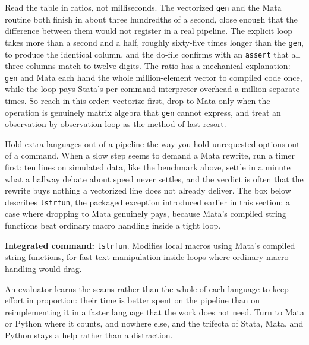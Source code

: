 Read the table in ratios, not milliseconds. The vectorized \texttt{gen} and the Mata routine both finish in about three hundredths of a second, close enough that the difference between them would not register in a real pipeline. The explicit loop takes more than a second and a half, roughly sixty-five times longer than the \texttt{gen}, to produce the identical column, and the do-file confirms with an \texttt{assert} that all three columns match to twelve digits. The ratio has a mechanical explanation: \texttt{gen} and Mata each hand the whole million-element vector to compiled code once, while the loop pays Stata's per-command interpreter overhead a million separate times. So reach in this order: vectorize first, drop to Mata only when the operation is genuinely matrix algebra that \texttt{gen} cannot express, and treat an observation-by-observation loop as the method of last resort.

Hold extra languages out of a pipeline the way you hold unrequested options out of a command. When a slow step seems to demand a Mata rewrite, run a timer first: ten lines on simulated data, like the benchmark above, settle in a minute what a hallway debate about speed never settles, and the verdict is often that the rewrite buys nothing a vectorized line does not already deliver. The box below describes \texttt{lstrfun}, the packaged exception introduced earlier in this section: a case where dropping to Mata genuinely pays, because Mata's compiled string functions beat ordinary macro handling inside a tight loop.

\begin{kaobox}[frametitle=Package Integration: \texttt{lstrfun}]
\textbf{Integrated command:} \texttt{lstrfun}. Modifies local macros using Mata's compiled string functions, for fast text manipulation inside loops where ordinary macro handling would drag.
\end{kaobox}

An evaluator learns the seams rather than the whole of each language to keep effort in proportion: their time is better spent on the pipeline than on reimplementing it in a faster language that the work does not need. Turn to Mata or Python where it counts, and nowhere else, and the trifecta of Stata, Mata, and Python stays a help rather than a distraction.

